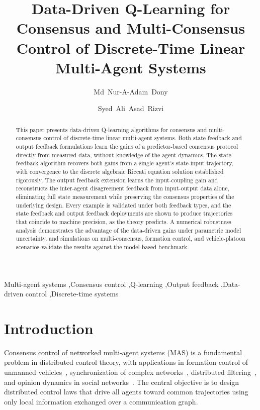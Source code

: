 \documentclass[final,5p,times]{elsarticle}
\theoremstyle{plain}
\theoremstyle{definition}
\theoremstyle{remark}
\begin{document}
\begin{frontmatter}
\title{Data-Driven Q-Learning for Consensus and Multi-Consensus Control of Discrete-Time Linear Multi-Agent Systems}
\author[ttu]{Md~Nur-A-Adam~Dony}
\author[ttu]{Syed~Ali~Asad~Rizvi\texorpdfstring{}{}}
\address[ttu]{Department of Electrical and Computer Engineering, Tennessee Technological University, Cookeville, TN 38505, USA}
\begin{abstract}
This paper presents data-driven Q-learning algorithms for consensus and multi-consensus control of discrete-time linear multi-agent systems. Both state feedback and output feedback formulations learn the gains of a predictor-based consensus protocol directly from measured data, without knowledge of the agent dynamics. The state feedback algorithm recovers both gains from a single agent's state-input trajectory, with convergence to the discrete algebraic Riccati equation solution established rigorously. The output feedback extension learns the input-coupling gain and reconstructs the inter-agent disagreement feedback from input-output data alone, eliminating full state measurement while preserving the consensus properties of the underlying design. Every example is validated under both feedback types, and the state feedback and output feedback deployments are shown to produce trajectories that coincide to machine precision, as the theory predicts. A numerical robustness analysis demonstrates the advantage of the data-driven gains under parametric model uncertainty, and simulations on multi-consensus, formation control, and vehicle-platoon scenarios validate the results against the model-based benchmark.
\end{abstract}
\begin{keyword}
Multi-agent systems \sep Consensus control \sep Q-learning \sep Output feedback \sep Data-driven control \sep Discrete-time systems
\end{keyword}
\end{frontmatter}
\section{Introduction}
\label{sec:intro}
Consensus control of networked multi-agent systems (MAS) is a fundamental problem in distributed control theory, with applications in formation control of unmanned vehicles~\cite{francis2016,dony2021distributed,dong2020tracking}, synchronization of complex networks~\cite{dorfler2014,li2010}, distributed filtering~\cite{battistelli2014}, and opinion dynamics in social networks~\cite{proskurnikov2017}. The central objective is to design distributed control laws that drive all agents toward common trajectories using only local information exchanged over a communication graph.
\end{document}
